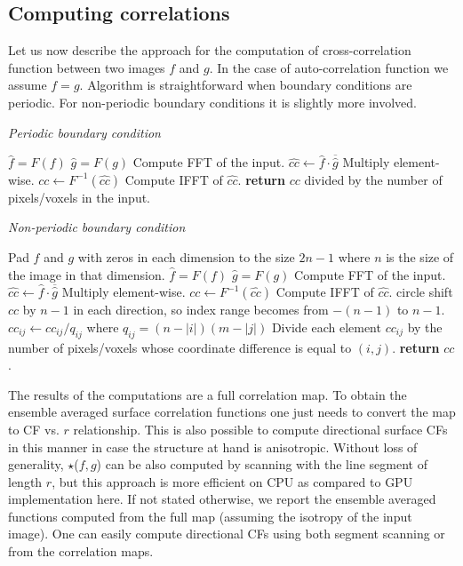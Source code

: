 \documentclass[reprint,amsmath,amssymb,aps,pre,showkeys,showpacs]{revtex4-1}
\begin{document}
\subsection{Computing correlations}
\label{sec:cross-comp}
Let us now describe the approach for the computation of cross-correlation
function between two images $f$ and $g$. In the case of auto-correlation
function we assume $f = g$. Algorithm is straightforward when boundary
conditions are periodic. For non-periodic boundary conditions it is slightly
more involved.

\textit{Periodic boundary condition}
\begin{algorithmic}[1]
  \State $\hat{f} = F(f)$
  \State $\hat{g} = F(g)$
  \Comment Compute FFT of the input.
  \State $\hat{cc} \gets \hat{f} \cdot \overline{\hat{g}}$
  \Comment Multiply element-wise.
  \State $cc \gets F^{-1}(\hat{cc})$
  \Comment Compute IFFT of $\hat{cc}$.
  \State \textbf{return} $cc$ divided by the number of pixels/voxels in the input.
  \EndProcedure
\end{algorithmic}

\textit{Non-periodic boundary condition}
\begin{algorithmic}[1]
  \State Pad $f$ and $g$ with zeros in each dimension to the size $2n-1$ where
  $n$ is the size of the image in that dimension.
  \State $\hat{f} = F(f)$
  \State $\hat{g} = F(g)$
  \Comment Compute FFT of the input.
  \State $\hat{cc} \gets \hat{f} \cdot \overline{\hat{g}}$
  \Comment Multiply element-wise.
  \State $cc \gets F^{-1}(\hat{cc})$
  \Comment Compute IFFT of $\hat{cc}$.
  \State circle shift $cc$ by $n - 1$ in each direction, so index range becomes
  from $-(n - 1)$ to $n - 1$.
  \State $cc_{ij} \gets cc_{ij} / q_{ij}$ where $q_{ij} = (n - |i|)(m - |j|)$
  \Comment Divide each element $cc_{ij}$ by the number of pixels/voxels whose
  coordinate difference is equal to $(i, j)$.
  \State \textbf{return} $cc$.
  \EndProcedure
\end{algorithmic}

The results of the computations are a full correlation map. To obtain the
ensemble averaged surface correlation functions one just needs to convert the
map to CF vs. $r$ relationship. This is also possible to compute directional
surface CFs in this manner in case the structure at hand is anisotropic. Without
loss of generality, $\star$($f, g$) can be also computed by scanning with the
line segment of length $r$, but this approach is more efficient on CPU as
compared to GPU implementation here. If not stated otherwise, we report the
ensemble averaged functions computed from the full map (assuming the isotropy of
the input image). One can easily compute directional CFs
\cite{jiao2014chawla,EPL1} using both segment scanning or from the correlation
maps.
\end{document}
